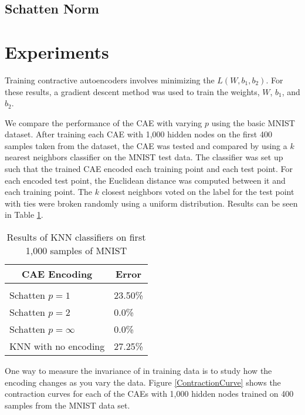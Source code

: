 \documentclass{article} %
\begin{document}
\subsection{Schatten Norm}

\section{Experiments}

Training contractive autoencoders involves minimizing the $L(W, b_1, b_2)$. For these results, a gradient descent method was used to train the weights, $W$, $b_1$, and $b_2$.

We compare the performance of the CAE with varying $p$ using the basic MNIST dataset. After training each CAE with 1,000 hidden nodes on the first 400 samples taken from the dataset, the CAE was tested and compared by using a $k$ nearest neighbors classifier on the MNIST test data. The classifier was set up such that the trained CAE encoded each training point and each test point. For each encoded test point, the Euclidean distance was computed between it and each training point. The $k$ closest neighbors voted on the label for the test point with ties were broken randomly using a uniform distribution. Results can be seen in Table \ref{knn-table}.

\begin{table}[t]
\caption{Results of KNN classifiers on first 1,000 samples of MNIST}
\label{knn-table}
\begin{center}
\begin{tabular}{ll}
\multicolumn{1}{c}{\bf CAE Encoding} & \multicolumn{1}{c}{\bf Error}
\\ \hline \\
Schatten $p=1$         	&	23.50\% \\
Schatten $p=2$          &	0.0\% \\
Schatten $p=\infty$     &	0.0\% \\
KNN with no encoding		& 27.25\% \\
\end{tabular}
\end{center}
\end{table}


One way to measure the invariance of in training data is to study how the encoding changes as you vary the data. Figure \ref{ContractionCurve} shows the contraction curves for each of the CAEs with 1,000 hidden nodes trained on 400 samples from the MNIST data set.
\end{document}
